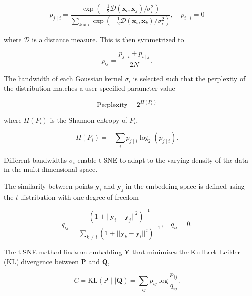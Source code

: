 \documentclass[runningheads]{llncs}
\begin{document}
\begin{equation}
p_{j \mid i} = \frac{\exp \left ( -\frac{1}{2} \mathcal{D}(\mathbf{x}_i, \mathbf{x}_j ) / \sigma_i^2 \right )}
{\sum_{k \neq i } \exp \left ( -\frac{1}{2} \mathcal{D}(\mathbf{x}_i, \mathbf{x}_k ) / \sigma_i^2 \right )}, \quad p_{i \mid i} = 0
\label{eq:gaussian_kernel}
\end{equation}

\noindent where $\mathcal{D}$ is a distance measure. This is then symmetrized to

\begin{equation}
p_{ij} = \frac{p_{j \mid i} + p_{i \mid j}}{2N}.
\label{eq:symmetrize}
\end{equation}

The bandwidth of each Gaussian kernel $\sigma_i$ is selected such that the
perplexity of the distribution matches a user-specified parameter value

\begin{equation}
\text{Perplexity} = 2^{H(P_i)}
\end{equation}

\noindent where $H(P_i)$ is the Shannon entropy of $P_i$,

\begin{equation}
H(P_i) = -\sum_i p_{j \mid i} \log_2 (p_{j \mid i}).
\end{equation}

\noindent Different bandwidths $\sigma_i$ enable t-SNE to adapt to the varying
density of the data in the multi-dimensional space.

The similarity between points $\mathbf{y}_i$ and $\mathbf{y}_j$ in the
embedding space is defined using the $t$-distribution with one degree of
freedom

\begin{equation}
q_{ij} = \frac{\left ( 1 + || \mathbf{y}_i - \mathbf{y}_j ||^2 \right )^{-1}}
{\sum_{k \neq l}\left ( 1 + || \mathbf{y}_k - \mathbf{y}_l ||^2 \right )^{-1}},
\quad q_{ii} = 0.
\label{eq:cauchy_kernel}
\end{equation}

The t-SNE method finds an embedding $\mathbf{Y}$ that minimizes the
Kullback-Leibler (KL) divergence between $\mathbf{P}$ and $\mathbf{Q}$,

\begin{equation}
C = \text{KL}(\mathbf{P} \mid \mid \mathbf{Q}) = \sum_{ij} p_{ij} \log \frac{p_{ij}}{q_{ij}}.
\label{eq:kl_divergence}
\end{equation}
\end{document}
